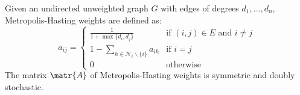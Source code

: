 \begin{example}
    Given an undirected unweighted graph $G$ with edges of degrees $d_1, \dots, d_n$, Metropolis-Hasting weights are defined as:
    \[
        a_{ij} = \begin{cases}
            \frac{1}{1+\max\{ d_i, d_j \}} & \text{if $(i, j) \in E$ and $i \neq j$} \\
            1 - \sum_{h \in \mathcal{N}_i \smallsetminus \{i\}} a_{ih} & \text{if $i=j$} \\
            0 & \text{otherwise}
        \end{cases}
    \]
    The matrix $\matr{A}$ of Metropolis-Hasting weights is symmetric and doubly stochastic.
\end{example}












